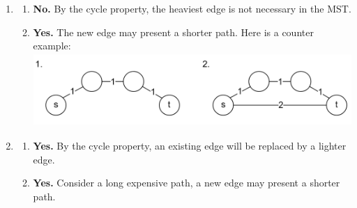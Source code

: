 \begin{Answer} 
    \begin{enumerate}
        \item \begin{enumerate}
            \item \textbf{No.} By the cycle property, the heaviest edge is not necessary in the MST.
            \item \textbf{Yes.} The new edge may present a shorter path. Here is a counter example:\\
            \includegraphics[height=1.1in]{./Sections/spanning/counter_2.png}\\
        \end{enumerate}
        \item \begin{enumerate}
            \item \textbf{Yes.} By the cycle property, an existing edge will be replaced by a lighter edge.
            \item \textbf{Yes.} Consider a long expensive path, a new edge may present a shorter path.
        \end{enumerate}
    \end{enumerate}
    
\end{Answer}